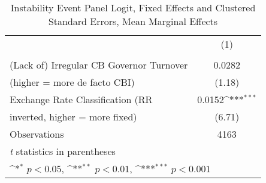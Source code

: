 \begin{table}[htbp]\centering
\def\sym#1{\ifmmode^{#1}\else\(^{#1}\)\fi}
\caption{Instability Event Panel Logit, Fixed Effects and Clustered Standard Errors, Mean Marginal Effects \label{margsJustBinInstabEventDF}}
\begin{tabular}{l*{1}{c}}
\toprule
                                        &\multicolumn{1}{c}{(1)}\\
                                        &\multicolumn{1}{c}{}\\
\midrule
(Lack of) Irregular CB Governor Turnover&   0.0282         \\
(higher = more de facto CBI)            &   (1.18)         \\
\addlinespace
Exchange Rate Classification (RR        &   0.0152\sym{***}\\
inverted, higher = more fixed)          &   (6.71)         \\
\midrule
Observations                            &     4163         \\
\bottomrule
\multicolumn{2}{l}{\footnotesize \textit{t} statistics in parentheses}\\
\multicolumn{2}{l}{\footnotesize \sym{*} \(p<0.05\), \sym{**} \(p<0.01\), \sym{***} \(p<0.001\)}\\
\end{tabular}
\end{table}
